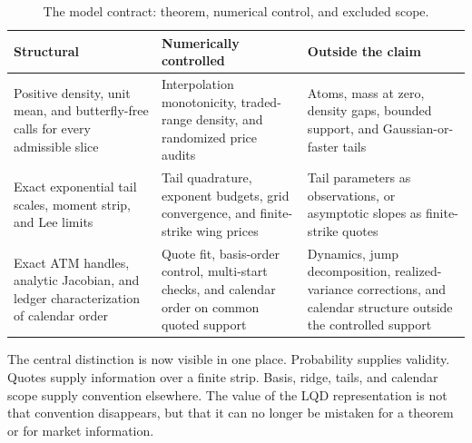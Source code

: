 \begin{table}[htbp]
\centering\small
\begin{tabular}{@{}>{\raggedright\arraybackslash}p{}
>{\raggedright\arraybackslash}p{}
>{\raggedright\arraybackslash}p{}@{}}
\toprule
\textbf{Structural} & \textbf{Numerically controlled} &
\textbf{Outside the claim}\\
\midrule
Positive density, unit mean, and butterfly-free calls for every admissible
slice & Interpolation monotonicity, traded-range density, and randomized
price audits & Atoms, mass at zero, density gaps, bounded support, and
Gaussian-or-faster tails\\[4pt]
Exact exponential tail scales, moment strip, and Lee limits & Tail
quadrature, exponent budgets, grid convergence, and finite-strike wing prices
& Tail parameters as observations, or asymptotic slopes as finite-strike
quotes\\[4pt]
Exact ATM handles, analytic Jacobian, and ledger characterization of calendar
order & Quote fit, basis-order control, multi-start checks, and calendar order
on common quoted support & Dynamics, jump decomposition, realized-variance
corrections, and calendar structure outside the controlled support\\
\bottomrule
\end{tabular}
\caption{The model contract: theorem, numerical control, and excluded scope.}
\label{tab:contract}
\end{table}

The central distinction is now visible in one place.  Probability supplies
validity.  Quotes supply information over a finite strip.  Basis, ridge,
tails, and calendar scope supply convention elsewhere.  The value of the LQD
representation is not that convention disappears, but that it can no longer
be mistaken for a theorem or for market information.
